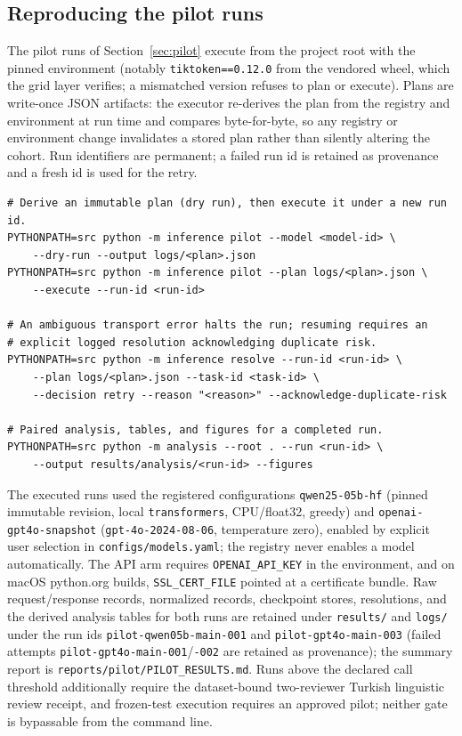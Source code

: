 \subsection{Reproducing the pilot runs}
\label{app:pilot-repro}

The pilot runs of Section~\ref{sec:pilot} execute from the project root with the pinned environment
(notably \texttt{tiktoken==0.12.0} from the vendored wheel, which the grid layer verifies; a mismatched
version refuses to plan or execute). Plans are write-once JSON artifacts: the executor re-derives the plan
from the registry and environment at run time and compares byte-for-byte, so any registry or environment
change invalidates a stored plan rather than silently altering the cohort. Run identifiers are permanent;
a failed run id is retained as provenance and a fresh id is used for the retry.

\begin{small}
\begin{verbatim}
# Derive an immutable plan (dry run), then execute it under a new run id.
PYTHONPATH=src python -m inference pilot --model <model-id> \
    --dry-run --output logs/<plan>.json
PYTHONPATH=src python -m inference pilot --plan logs/<plan>.json \
    --execute --run-id <run-id>

# An ambiguous transport error halts the run; resuming requires an
# explicit logged resolution acknowledging duplicate risk.
PYTHONPATH=src python -m inference resolve --run-id <run-id> \
    --plan logs/<plan>.json --task-id <task-id> \
    --decision retry --reason "<reason>" --acknowledge-duplicate-risk

# Paired analysis, tables, and figures for a completed run.
PYTHONPATH=src python -m analysis --root . --run <run-id> \
    --output results/analysis/<run-id> --figures
\end{verbatim}
\end{small}

The executed runs used the registered configurations \texttt{qwen25-05b-hf} (pinned immutable revision,
local \texttt{transformers}, CPU/float32, greedy) and \texttt{openai-gpt4o-snapshot}
(\texttt{gpt-4o-2024-08-06}, temperature zero), enabled by explicit user selection in
\texttt{configs/models.yaml}; the registry never enables a model automatically. The API arm requires
\texttt{OPENAI\_API\_KEY} in the environment, and on macOS python.org builds, \texttt{SSL\_CERT\_FILE}
pointed at a certificate bundle. Raw request/response records, normalized records, checkpoint stores,
resolutions, and the derived analysis tables for both runs are retained under \texttt{results/} and
\texttt{logs/} under the run ids \texttt{pilot-qwen05b-main-001} and \texttt{pilot-gpt4o-main-003}
(failed attempts \texttt{pilot-gpt4o-main-001}/\texttt{-002} are retained as provenance); the summary
report is \texttt{reports/pilot/PILOT\_RESULTS.md}. Runs above the declared call threshold additionally require the
dataset-bound two-reviewer Turkish linguistic review receipt, and frozen-test execution requires an
approved pilot; neither gate is bypassable from the command line.

